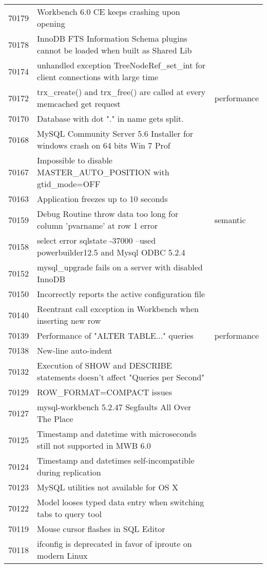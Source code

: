 \begin{longtable}[c]{p{1cm}p{10cm}p{1cm}}
70179 & Workbench 6.0 CE keeps crashing upon opening &  \\
70178 & InnoDB FTS Information Schema plugins cannot be loaded when built as Shared Lib &  \\
70174 & unhandled exception TreeNodeRef\_set\_int for client connections with large time &  \\
70172 & trx\_create() and trx\_free() are called at every memcached get request & performance \\
70170 & Database with dot "." in name gets split. &  \\
70168 & MySQL Community Server 5.6 Installer for windows crash on 64 bits Win 7 Prof &  \\
70167 & Impossible to disable MASTER\_AUTO\_POSITION with gtid\_mode=OFF &  \\
70163 & Application freezes up to 10 seconds &  \\
70159 & Debug Routine throw data too long for column 'pvarname' at row 1 error & semantic \\
70158 & select error sqlstate -37000 --used powerbuilder12.5 and Mysql ODBC 5.2.4 &  \\
70152 & mysql\_upgrade fails on a server with disabled InnoDB &  \\
70150 & Incorrectly reports the active configuration file &  \\
70140 & Reentrant call exception in Workbench when inserting new row &  \\
70139 & Performance of "ALTER TABLE..." queries & performance \\
70138 & New-line auto-indent &  \\
70132 & Execution of SHOW and DESCRIBE statements doesn't affect "Queries per Second" &  \\
70129 & ROW\_FORMAT=COMPACT issues &  \\
70127 & mysql-workbench 5.2.47 Segfaults All Over The Place &  \\
70125 & Timestamp and datetime with microseconds still not supported in MWB 6.0 &  \\
70124 & Timestamp and datetimes self-incompatible during replication &  \\
70123 & MySQL utilities not available for OS X &  \\
70122 & Model looses typed data entry when switching tabs to query tool &  \\
70119 & Mouse cursor flashes in SQL Editor &  \\
70118 & ifconfig is deprecated in favor of iproute on modern Linux &  \\

\end{longtable}
